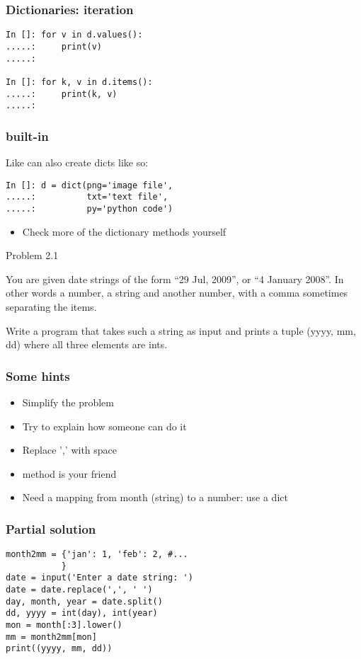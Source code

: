 \documentclass[14pt,compress]{beamer}
\begin{document}
\begin{frame}[fragile]
  \frametitle{Dictionaries:  iteration}
  \begin{lstlisting}
In []: for v in d.values():
.....:     print(v)
.....:

In []: for k, v in d.items():
.....:     print(k, v)
.....:
  \end{lstlisting}
\end{frame}

\begin{frame}[fragile]
  \frametitle{ built-in}
Like  can also create dicts like so:
\begin{lstlisting}
In []: d = dict(png='image file',
.....:          txt='text file',
.....:          py='python code')
\end{lstlisting}
\begin{itemize}
\item Check more of the dictionary methods yourself
\end{itemize}
\end{frame}

\begin{frame} {Problem 2.1}

  You are given date strings of the form ``29 Jul, 2009'', or ``4 January
  2008''. In other words a number, a string and another number, with a comma
  sometimes separating the items.

  Write a program that takes such a string as input and prints a tuple (yyyy,
  mm, dd) where all three elements are ints.
\end{frame}

\begin{frame}[fragile]
  \frametitle{Some hints}
  \begin{itemize}
  \item Simplify the problem
  \item Try to explain how someone can do it
    \vspace*{2em}

  \item Replace ',' with space
  \item {} method is your friend
  \item Need a mapping from month (string) to a number: use a dict
  \end{itemize}
\end{frame}

\begin{frame}[fragile]
  \frametitle{Partial solution}
\begin{lstlisting}
month2mm = {'jan': 1, 'feb': 2, #...
           }
date = input('Enter a date string: ')
date = date.replace(',', ' ')
day, month, year = date.split()
dd, yyyy = int(day), int(year)
mon = month[:3].lower()
mm = month2mm[mon]
print((yyyy, mm, dd))
\end{lstlisting}
\end{frame}
\end{document}

